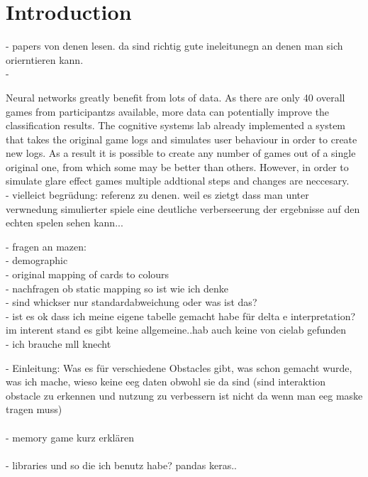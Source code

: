 
\chapter{Introduction}
\label{sec:intro}

- papers von denen lesen. da sind richtig gute ineleitunegn an denen man sich orierntieren kann. \\
- 

Neural networks greatly benefit from lots of data. As there are only 40  overall games from participantzs available, more data can potentially improve the classification results.  The cognitive systems lab already implemented a system that takes the original game logs and simulates user behaviour in order to create new logs. As a result it is possible to create any number of games out of a single original one, from which some may be better than others. However, in order to simulate glare effect games multiple addtional steps and changes are neccesary. \\

- vielleict begrüdung: referenz zu denen. weil es zietgt dass man unter verwnedung simulierter spiele eine deutliche verberseerung der ergebnisse auf den echten spelen sehen kann...\

\newpage

- fragen an mazen:\\
- demographic\\
- original mapping of cards to colours\\
- nachfragen ob static mapping so ist wie ich denke\\
- sind whickser nur standardabweichung oder was ist das?\\
- ist es ok dass ich meine eigene tabelle gemacht habe für delta e interpretation? im interent stand es gibt keine allgemeine..hab auch keine von cielab gefunden\\
- ich brauche mll knecht

\newpage

- Einleitung: Was es für verschiedene Obstacles gibt, was schon gemacht wurde, was ich mache, wieso keine eeg daten obwohl sie da sind (sind interaktion obstacle zu erkennen und nutzung zu verbessern ist nicht da wenn man eeg maske tragen muss)\\\\
- memory game kurz erklären\\\\
- libraries und so die ich benutz habe? pandas keras..\\\\

